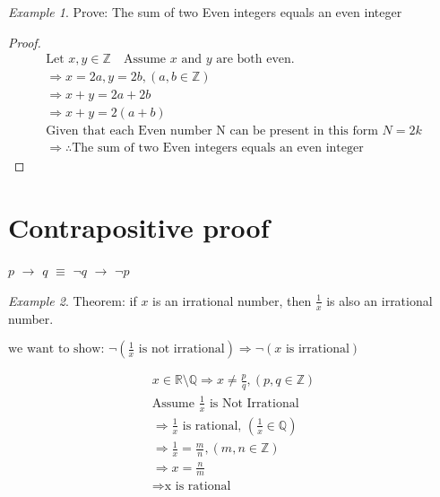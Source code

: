 \documentclass[12pt]{article}
\theoremstyle{remark}
\newtheorem*{example}{Example}
\newcommand{\Z}{\mathbb{Z}}
\begin{document}
	\begin{example}
		Prove: The sum of two Even integers equals an even integer\\
		\begin{proof}
			\begin{gather}
				\text{Let }x, y \in \mathbb{Z} \quad \text{Assume $x$ and $y$ are both even.} \\ 
				\Rightarrow x = 2a, y = 2b, (a, b \in \mathbb{Z})
				\\ \Rightarrow x + y = 2a + 2b \\ 
				\Rightarrow x + y = 2(a + b) \\
				\text{Given that each Even number N can be present in this form $N = 2k$}\\
				\Rightarrow \therefore \text{The sum of two Even integers equals an even integer}
			\end{gather}
		\end{proof}
	\end{example}
	
	\section{Contrapositive proof}
	\begin{center}
		$p$ $\rightarrow$ $q$ $\equiv$ $\neg q$  $\rightarrow$ $\neg p$\\
	\end{center}
	\begin{example}
		Theorem: if $x$ is an irrational number, then $\frac{1}{x}$ is also an irrational number.
	\end{example}
	$\text{we want to show: }\neg (\frac{1}{x} \text{ is not irrational}) \Rightarrow \neg (x \text{ is irrational}) $

	\begin{gather}
		x \in \mathbb{R} \setminus \mathbb{Q} \Rightarrow x \neq \frac{p}{q}, (p, q \in \mathbb{Z}) \\ 
		\text{Assume } \frac{1}{x} \text{ is Not Irrational}\\
		\Rightarrow \frac{1}{x} \text{ is rational, } (\frac{1}{x} \in \mathbb{Q})\\
		\Rightarrow \frac{1}{x} = \frac{m}{n}, (m, n \in \Z)\\
		\Rightarrow x = \frac{n}{m} \\
		\Rightarrow \text{x is rational}
	\end{gather}
\end{document}
